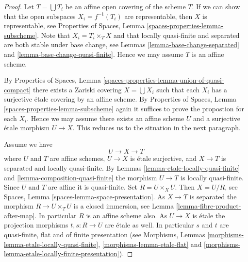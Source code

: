 \begin{proof}
Let $T = \bigcup T_i$ be an affine open covering of the scheme $T$.
If we can show that the open subspaces $X_i = f^{-1}(T_i)$ are
representable, then $X$ is representable, see
Properties of Spaces, Lemma \ref{spaces-properties-lemma-subscheme}.
Note that $X_i = T_i \times_T X$ and that locally quasi-finite and
separated are both stable under base change, see
Lemmas \ref{lemma-base-change-separated} and
\ref{lemma-base-change-quasi-finite}.
Hence we may assume $T$ is an affine scheme.

\medskip\noindent
By
Properties of Spaces,
Lemma \ref{spaces-properties-lemma-union-of-quasi-compact}
there exists a Zariski covering $X = \bigcup X_i$
such that each $X_i$ has a surjective \'etale covering by
an affine scheme. By
Properties of Spaces, Lemma \ref{spaces-properties-lemma-subscheme}
again it suffices to prove the propostion for each $X_i$.
Hence we may assume there exists an affine scheme $U$ and a
surjective \'etale morphism $U \to X$. This reduces us to the
situation in the next paragraph.

\medskip\noindent
Assume we have
$$
U \longrightarrow X \longrightarrow T
$$
where $U$ and $T$ are affine schemes, $U \to X$ is \'etale surjective, and
$X \to T$ is separated and locally quasi-finite. By
Lemmas \ref{lemma-etale-locally-quasi-finite} and
\ref{lemma-composition-quasi-finite}
the morphism $U \to T$ is locally quasi-finite.
Since $U$ and $T$ are affine it is quasi-finite.
Set $R = U \times_X U$. Then $X = U/R$, see
Spaces, Lemma \ref{spaces-lemma-space-presentation}.
As $X \to T$ is separated the
morphism $R \to U \times_T U$ is a closed immersion, see
Lemma \ref{lemma-fibre-product-after-map}.
In particular $R$ is an affine scheme also.
As $U \to X$ is \'etale the projection morphisms
$t, s : R \to U$ are \'etale as well. In particular $s$ and $t$ are
quasi-finite, flat and of finite presentation (see
Morphisms, Lemmas \ref{morphisms-lemma-etale-locally-quasi-finite},
\ref{morphisms-lemma-etale-flat} and
\ref{morphisms-lemma-etale-locally-finite-presentation}).


\end{proof}
